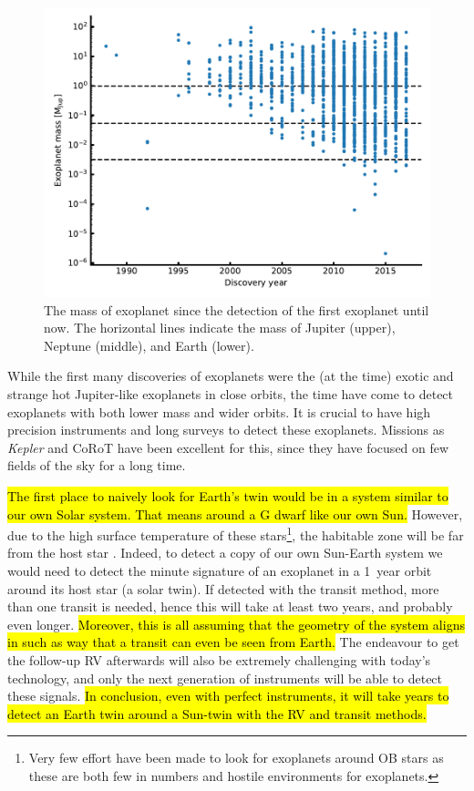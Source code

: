 \begin{figure}[htpb!]
    \centering
    \includegraphics[width=0.8\linewidth]{figures/exoplanetMass.pdf}
    \caption{The mass of exoplanet since the detection of the first exoplanet until now. The
             horizontal lines indicate the mass of Jupiter (upper), Neptune (middle), and Earth
             (lower).}
    \label{fig:exoplanetMass}
\end{figure}

While the first many discoveries of exoplanets were the (at the time) exotic and strange hot
Jupiter-like exoplanets in close orbits, the time have come to detect exoplanets with both lower
mass and wider orbits. It is crucial to have high precision instruments and long surveys to detect
these exoplanets. Missions as \emph{Kepler} and CoRoT have been excellent for this, since they have
focused on few fields of the sky for a long time.

\hl{The first place to naively look for Earth's twin would be in a system similar to our own Solar
system. That means around a G dwarf like our own Sun.} However, due to the high surface temperature
of these stars\footnote{Very few effort have been made to look for exoplanets around OB stars as
these are both few in numbers and hostile environments for exoplanets.}, the habitable zone will be
far from the host star \citep[see e.g.][]{Kasting1993}. Indeed, to detect a copy of our own
Sun-Earth system we would need to detect the minute signature of an exoplanet in a \SI{1}{year}
orbit around its host star (a solar twin). If detected with the transit method, more than one
transit is needed, hence this will take at least two years, and probably even longer. \hl{Moreover,
this is all assuming that the geometry of the system aligns in such as way that a transit can even
be seen from Earth.} The endeavour to get the follow-up RV afterwards will also be extremely
challenging with today's technology, and only the next generation of instruments will be able to
detect these signals. \hl{In conclusion, even with perfect instruments, it will take years to detect
an Earth twin around a Sun-twin with the RV and transit methods.}

